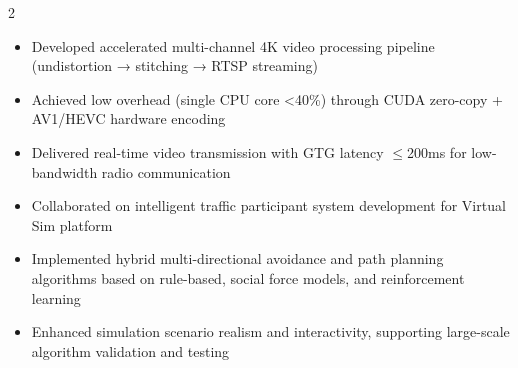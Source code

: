 \documentclass[10pt,a4paper,ragged2e,withhyper]{altacv}
\begin{document}
\begin{paracol}{2}


\begin{itemize}
\item Developed accelerated multi-channel 4K video processing pipeline (undistortion → stitching → RTSP streaming)
\item Achieved low overhead (single CPU core <40\%) through CUDA zero-copy + AV1/HEVC hardware encoding
\item Delivered real-time video transmission with GTG latency $\leq$200ms for low-bandwidth radio communication
\end{itemize}

\begin{itemize}
\item Collaborated on intelligent traffic participant system development for Virtual Sim platform
\item Implemented hybrid multi-directional avoidance and path planning algorithms based on rule-based, social force models, and reinforcement learning
\item Enhanced simulation scenario realism and interactivity, supporting large-scale algorithm validation and testing
\end{itemize}








\medskip

\end{paracol}
\end{document}
